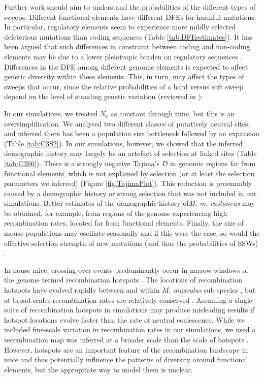 	Further work should aim to understand the probabilities of the different types of sweeps. Different functional elements have different DFEs for harmful mutations. In particular, regulatory elements seem to experience more mildly selected deleterious mutations than coding sequences \citep{RN122, RN346} (Table \ref{tab:DFEestimates}). It has been argued that such differences in constraint between coding and non-coding elements may be due to a lower pleiotropic burden on regulatory sequences \citep{RN346}. Differences in the DFE among different genomic elements is expected to affect genetic diversity within these elements. This, in turn, may affect the types of sweeps that occur, since the relative probabilities of a hard versus soft sweep depend on the level of standing genetic variation (reviewed in \cite{RN336}). 

	In our simulations, we treated $N_e$ as constant through time, but this is an oversimplification. We analysed two different classes of putatively neutral sites, and inferred there has been a population size bottleneck followed by an expansion (Table \ref{tab:C3S2}). In our simulations, however, we showed that the inferred demographic history may largely be an artefact of selection at linked sites (Table \ref{tab:C3S6}). There is a strongly negative Tajima's $D$ in genomic regions far from functional elements, which is not explained by selection (or at least the selection parameters we inferred) (Figure \ref{fig:TajimaPlot}). This reduction is presumably caused by a demographic history or strong selection that was not included in our simulations. Better estimates of the demographic history of\textit{M. m. castaneus} may be obtained, for example, from regions of the genome experiencing high recombination rates, located far from functional elements. Finally, the size of mouse populations may oscillate seasonally \citep{RN392} and if this were the case, so would the effective selection strength of new mutations (and thus the probabilities of SSWs) \citep{RN350}. 

	In house mice, crossing over events predominantly occur in narrow windows of the genome termed recombination hotspots \cite{RN254}. The locations of recombination hotspots have evolved rapidly between and within \textit{M. musculus} sub-species \citep{RN249}, but at broad-scales recombination rates are relatively conserved \citep{RN340}. Assuming a single suite of recombination hotspots in simulations may produce misleading results if hotspot locations evolve faster than the rate of neutral coalescence. While we included fine-scale variation in recombination rates in our simulations, we used a recombination map was inferred at a broader scale than the scale of hotspots \citep{RN340}. However, hotspots are an important feature of the recombination landscape in mice and thus potentially influence the patterns of diversity around functional elements, but the appropriate way to model them is unclear.

